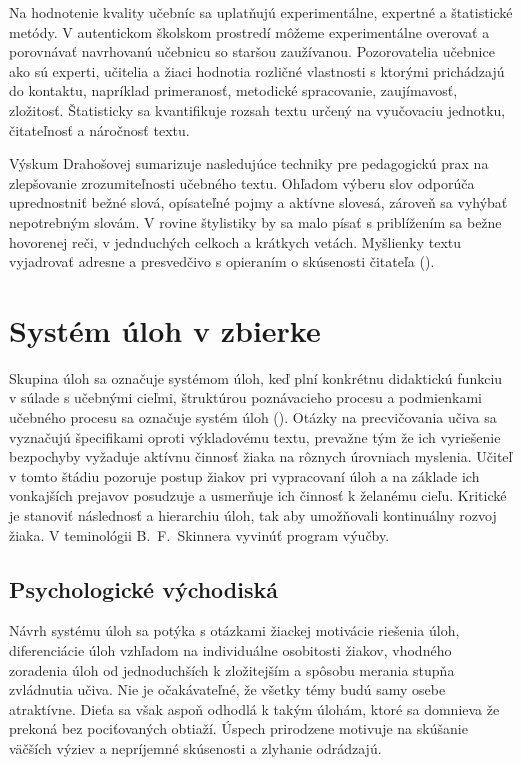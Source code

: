 Na hodnotenie kvality učebníc sa uplatňujú experimentálne, expertné a štatistické metódy. V autentickom školskom prostredí môžeme experimentálne overovať a porovnávať navrhovanú učebnicu so staršou zaužívanou. Pozorovatelia učebnice ako sú experti, učitelia a žiaci hodnotia rozličné vlastnosti s ktorými prichádzajú do kontaktu, napríklad primeranosť, metodické spracovanie, zaujímavosť, zložitosť. Štatisticky sa kvantifikuje rozsah textu určený na vyučovaciu jednotku, čitateľnosť a náročnosť textu.

Výskum Drahošovej sumarizuje nasledujúce techniky pre pedagogickú prax na zlepšovanie zrozumiteľnosti učebného textu. Ohľadom výberu slov odporúča uprednostniť bežné slová, opísateľné pojmy a aktívne slovesá, zároveň sa vyhýbať nepotrebným slovám. V rovine štylistiky by sa malo písať s priblížením sa bežne hovorenej reči, v jednduchých celkoch a krátkych vetách. Myšlienky textu vyjadrovať adresne a presvedčivo s opieraním o skúsenosti čitateľa (\cite{drahosova_hodnotenie_2014}).

\section{Systém úloh v zbierke}
Skupina úloh sa označuje systémom úloh, keď plní konkrétnu didaktickú funkciu v súlade s učebnými cieľmi, štruktúrou poznávacieho procesu a podmienkami učebného procesu sa označuje systém úloh (\cite{mindakova_tvorba_2008}). Otázky na precvičovania učiva sa vyznačujú špecifikami oproti výkladovému textu, prevažne tým že ich vyriešenie bezpochyby vyžaduje aktívnu činnosť žiaka na rôznych úrovniach myslenia. Učiteľ v tomto štádiu pozoruje postup žiakov pri vypracovaní úloh a na základe ich vonkajších prejavov posudzuje a usmerňuje ich činnosť k želanému cieľu. Kritické je stanoviť následnosť a hierarchiu úloh, tak aby umožňovali kontinuálny rozvoj žiaka. V teminológii B.~F.~Skinnera vyvinúť program výučby.   

\subsection{Psychologické východiská}
Návrh systému úloh sa potýka s otázkami žiackej motivácie riešenia úloh, diferenciácie úloh vzhľadom na individuálne osobitosti žiakov, vhodného zoradenia úloh od jednoduchších k zložitejším a spôsobu merania stupňa zvládnutia učiva. Nie je očakávateľné, že všetky témy budú samy osebe atraktívne. Dieťa sa však aspoň odhodlá k takým úlohám, ktoré sa domnieva že prekoná bez pociťovaných obtiaží. Úspech prirodzene motivuje na skúšanie väčších výziev a nepríjemné skúsenosti a zlyhanie odrádzajú. 

